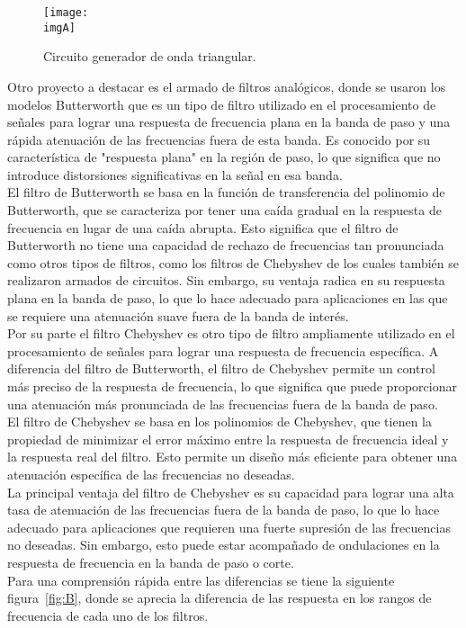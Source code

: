 \documentclass[a4paper,12pt]{article}
\newcommand{\imgA}{img/imagen1.jpg}
\begin{document}
    \begin{figure}[H] 
        \centering 
        \texttt{[image: \\imgA]} 
        \caption{Circuito generador de onda triangular.} 
        \label{fig:A} 
    \end{figure} 

    Otro proyecto a destacar es el armado de filtros analógicos, donde se usaron los modelos Butterworth que es un tipo de filtro utilizado en el procesamiento de señales para lograr una respuesta de frecuencia plana en la banda de paso y una rápida atenuación de las frecuencias fuera de esta banda. Es conocido por su característica de "respuesta plana" en la región de paso, lo que significa que no introduce distorsiones significativas en la señal en esa banda.\\
    El filtro de Butterworth se basa en la función de transferencia del polinomio de Butterworth, que se caracteriza por tener una caída gradual en la respuesta de frecuencia en lugar de una caída abrupta. Esto significa que el filtro de Butterworth no tiene una capacidad de rechazo de frecuencias tan pronunciada como otros tipos de filtros, como los filtros de Chebyshev de los cuales también se realizaron armados de circuitos. Sin embargo, su ventaja radica en su respuesta plana en la banda de paso, lo que lo hace adecuado para aplicaciones en las que se requiere una atenuación suave fuera de la banda de interés.\\
    Por su parte el filtro Chebyshev es otro tipo de filtro ampliamente utilizado en el procesamiento de señales para lograr una respuesta de frecuencia específica. A diferencia del filtro de Butterworth, el filtro de Chebyshev permite un control más preciso de la respuesta de frecuencia, lo que significa que puede proporcionar una atenuación más pronunciada de las frecuencias fuera de la banda de paso.\\
    El filtro de Chebyshev se basa en los polinomios de Chebyshev, que tienen la propiedad de minimizar el error máximo entre la respuesta de frecuencia ideal y la respuesta real del filtro. Esto permite un diseño más eficiente para obtener una atenuación específica de las frecuencias no deseadas.\\
    La principal ventaja del filtro de Chebyshev es su capacidad para lograr una alta tasa de atenuación de las frecuencias fuera de la banda de paso, lo que lo hace adecuado para aplicaciones que requieren una fuerte supresión de las frecuencias no deseadas. Sin embargo, esto puede estar acompañado de ondulaciones en la respuesta de frecuencia en la banda de paso o corte.\\
    Para una comprensión rápida entre las diferencias se tiene la siguiente figura~\ref{fig:B}, donde se aprecia la diferencia de las respuesta en los rangos de frecuencia de cada uno de los filtros. 
\end{document}
